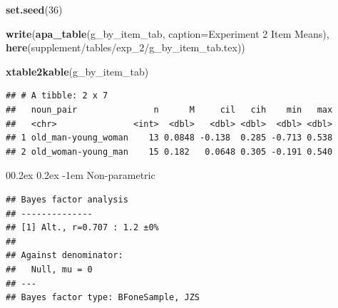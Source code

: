 \documentclass[
  doc,floatsintext]{apa6}
\makeatletter
\newenvironment{Shaded}{\begin{snugshade}}{\end{snugshade}}
\newcommand{\AttributeTok}[1]{\textcolor[rgb]{0.13,0.29,0.53}{#1}}
\newcommand{\CommentTok}[1]{\textcolor[rgb]{0.56,0.35,0.01}{\textit{#1}}}
\newcommand{\DecValTok}[1]{\textcolor[rgb]{0.00,0.00,0.81}{#1}}
\newcommand{\FunctionTok}[1]{\textcolor[rgb]{0.13,0.29,0.53}{\textbf{#1}}}
\newcommand{\NormalTok}[1]{#1}
\newcommand{\OtherTok}[1]{\textcolor[rgb]{0.56,0.35,0.01}{#1}}
\newcommand{\SpecialCharTok}[1]{\textcolor[rgb]{0.81,0.36,0.00}{\textbf{#1}}}
\newcommand{\StringTok}[1]{\textcolor[rgb]{0.31,0.60,0.02}{#1}}
\let\oldparagraph\paragraph
\renewcommand{\paragraph}{
    \@ifstar
      \xxxParagraphStar
      \xxxParagraphNoStar
  }
\newcommand{\xxxParagraphStar}[1]{\oldparagraph*{#1}\mbox{}}
\newcommand{\xxxParagraphNoStar}[1]{\oldparagraph{#1}\mbox{}}
\renewcommand{\paragraph}{\@startsection{paragraph}{4}{\parindent}%
  {0\baselineskip \@plus 0.2ex \@minus 0.2ex}%
  {-1em}%
  {\normalfont\normalsize\bfseries\itshape\typesectitle}}
\makeatother
\begin{document}
\begin{Shaded}
\begin{Highlighting}[]
\FunctionTok{set.seed}\NormalTok{(}\DecValTok{36}\NormalTok{)}

\FunctionTok{write}\NormalTok{(}\FunctionTok{apa\_table}\NormalTok{(g\_by\_item\_tab, }
                \AttributeTok{caption=}\StringTok{\textquotesingle{}Experiment 2 Item Means\textquotesingle{}}\NormalTok{),}
      \FunctionTok{here}\NormalTok{(}\StringTok{\textquotesingle{}supplement/tables/exp\_2/g\_by\_item\_tab.tex\textquotesingle{}}\NormalTok{))}

\FunctionTok{xtable2kable}\NormalTok{(g\_by\_item\_tab)}
\end{Highlighting}
\end{Shaded}

\begin{verbatim}
## # A tibble: 2 x 7
##   noun_pair               n      M     cil   cih    min   max
##   <chr>               <int>  <dbl>   <dbl> <dbl>  <dbl> <dbl>
## 1 old_man-young_woman    13 0.0848 -0.138  0.285 -0.713 0.538
## 2 old_woman-young_man    15 0.182   0.0648 0.305 -0.191 0.540
\end{verbatim}

\paragraph{Non-parametric}\label{non-parametric}

\begin{Shaded}
\end{Shaded}

\begin{verbatim}
## Bayes factor analysis
## --------------
## [1] Alt., r=0.707 : 1.2 ±0%
## 
## Against denominator:
##   Null, mu = 0 
## ---
## Bayes factor type: BFoneSample, JZS
\end{verbatim}

\begin{Shaded}
\end{Shaded}
\end{document}
